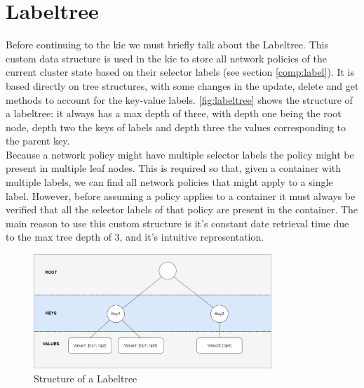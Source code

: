 

\section{Labeltree} \label{impl:labeltree}
Before continuing to the \acrlong{kic} we must briefly talk about the Labeltree. This custom data structure is used in the \acrshort{kic} to store all network policies of the current cluster state based on their selector labels (see section \ref{comp:label}). It is based directly on tree structures, with some changes in the update, delete and get methods to account for the key-value labels. \autoref{fig:labeltree} shows the structure of a labeltree: it always has a max depth of three, with depth one being the root node, depth two the keys of labels and depth three the values corresponding to the parent key. 
\\[10pt]

Because a network policy might have multiple selector labels the policy might be present in multiple leaf nodes. This is required so that, given a container with multiple labels, we can find all network policies that might apply to a single label. However, before assuming a policy applies to a container it must always be verified that all the selector labels of that policy are present in the container. The main reason to use this custom structure is it's constant date retrieval time due to the max tree depth of 3, and it's intuitive representation. 
\begin{figure}[htbp]
  \centering
  \includegraphics[width=0.8\textwidth]{images/labeltree.png}
  \caption{Structure of a Labeltree}
  \label{fig:labeltree}
\end{figure}

\newpage
